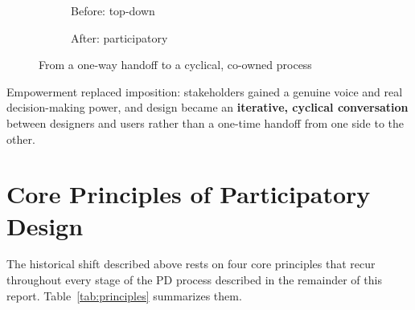 \documentclass[a4paper,12pt]{article}
\begin{document}
\begin{figure}[H]
\centering
\begin{subfigure}{0.47\textwidth}
\centering
{}
\caption{Before: top-down}
\end{subfigure}
\hfill
\begin{subfigure}{0.47\textwidth}
\centering
{}
\caption{After: participatory}
\end{subfigure}
\caption{From a one-way handoff to a cyclical, co-owned process}
\label{fig:beforeafter}
\end{figure}

Empowerment replaced imposition: stakeholders gained a genuine voice and real decision-making power, and design became an \textbf{iterative, cyclical conversation} between designers and users rather than a one-time handoff from one side to the other.

\section{Core Principles of Participatory Design}
\label{sec:principles}
The historical shift described above rests on four core principles that recur throughout every stage of the PD process described in the remainder of this report. Table~\ref{tab:principles} summarizes them.
\end{document}
